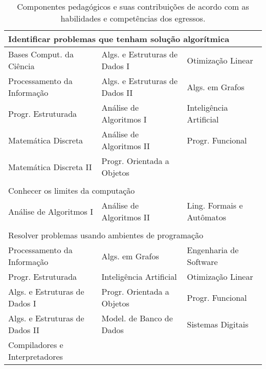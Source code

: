 \begin{longtable}{|p{}p{}p{}|}
    \caption{Componentes pedagógicos e suas contribuições de acordo com as habilidades e competências dos egressos.}
    \label{tab:mapeamento_competencias}
    \endfirsthead
    \endhead

    \multicolumn{3}{p{0.95\textwidth}}{Identificar problemas que tenham solução algorítmica}\\
    \hline
    \textcolor{nred}{Bases Comput. da Ciência}  &
    \textcolor{nblue}{Algs. e Estruturas de Dados I} &
    \textcolor{nblue}{Otimização Linear} \\
    \textcolor{nred}{Processamento da Informação} &
    \textcolor{nblue}{Algs. e Estruturas de Dados II} &
    \textcolor{nblue}{Algs. em Grafos} \\
    \textcolor{nblue}{Progr. Estruturada} &
    \textcolor{nblue}{Análise de Algoritmos I} &
    \textcolor{nblue}{Inteligência Artificial} \\
    \textcolor{nblue}{Matemática Discreta} &
    \textcolor{nblue}{Análise de Algoritmos II} &
    \textcolor{nblue}{Progr. Funcional} \\
    \textcolor{nblue}{Matemática Discreta II} &
    \textcolor{nblue}{Progr. Orientada a Objetos} & \\

    \hline
    \multicolumn{3}{p{0.95\textwidth}}{}\\
    
    \multicolumn{3}{p{0.95\textwidth}}{Conhecer os limites da computação}\\
    \hline
    \textcolor{nblue}{Análise de Algoritmos I} &
    \textcolor{nblue}{Análise de Algoritmos II} &
    \textcolor{nblue}{Ling. Formais e Autômatos} \\

    \hline
    \multicolumn{3}{p{0.95\textwidth}}{}\\

    \multicolumn{3}{p{0.95\textwidth}}{Resolver problemas usando ambientes de programação}\\
    \hline
    \textcolor{nred}{Processamento da Informação} &
    \textcolor{nblue}{Algs. em Grafos} &
    \textcolor{nblue}{Engenharia de Software} \\
    \textcolor{nblue}{Progr. Estruturada} &
    \textcolor{nblue}{Inteligência Artificial} &
    \textcolor{nblue}{Otimização Linear}\\
    \textcolor{nblue}{Algs. e Estruturas de Dados I} &
    \textcolor{nblue}{Progr. Orientada a Objetos} &
    \textcolor{nblue}{Progr. Funcional}\\
    \textcolor{nblue}{Algs. e Estruturas de Dados II} &
    \textcolor{nblue}{\small Model. de Banco de Dados} &
    \textcolor{nblue}{Sistemas Digitais}\\
    \textcolor{nblue}{Compiladores e Interpretadores} & & \\
    \hline
    

\end{longtable}
